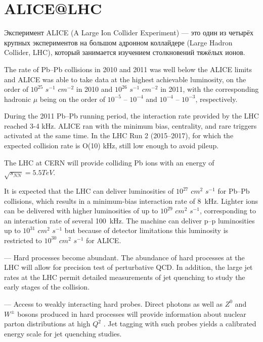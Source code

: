 \section{ALICE@LHC}


Эксперимент ALICE (A Large Ion Collider Experiment) --- это один из четырёх крупных экспериментов на большом адронном коллайдере (Large Hadron Collider, LHC), который занимается изучением столкновений тяжёлых ионов.

The rate of Pb--Pb collisions in 2010 and 2011 was well below the ALICE limits and ALICE was able to take data at the highest achievable luminosity, on the order of $10^25$ $s^{-1}$ $cm^{-2}$ in 2010 and $10^{26}$ $s^{-1}$ $cm^{-2}$ in 2011, with the corresponding hadronic $\mu$ being on the order of $10^{-5}$ -- $10^{-4}$ and $10^{-4}$ -- $10^{-3}$, respectively.

During the 2011 Pb--Pb running period, the interaction rate provided by the LHC reached 3-4 kHz. ALICE ran with the minimum bias, centrality, and rare triggers activated at the same time. In the LHC Run 2 (2015--2017), for which the expected collision rate is O(10) kHz, still low enough to avoid pileup.

The LHC at CERN will provide colliding Pb ions with an energy of $\sqrt{s_{NN}}=5.5 TeV$.

It is expected that the LHC can deliver luminosities of $10^{27}$ $cm^{2}$ $s^{-1}$ for Pb--Pb collisions, which results in a minimum-bias interaction rate of 8~kHz. Lighter ions can be delivered with higher luminosities of up to $10^{29}$ $cm^{2}$ $s^{-1}$, corresponding to an interaction rate of several 100~kHz. The machine can deliver p--p luminosities up to $10^{31}$ $cm^{2}$ $s^{-1}$ but because of detector limitations this luminosity is restricted to $10^{30}$ $cm^{2}$ $s^{-1}$ for ALICE.

--- Hard processes become abundant.
The abundance of hard processes at the LHC will allow for precision test of perturbative QCD. In addition, the large jet rates at the LHC permit detailed measurements of jet quenching to study the early stages of the collision.

--- Access to weakly interacting hard probes.
Direct photons as well as $Z^{0}$ and $W^{\pm}$ bosons produced in hard processes will provide information about nuclear parton distributions at high $Q^{2}$ . Jet tagging with such probes yields a calibrated energy scale for jet quenching studies.


